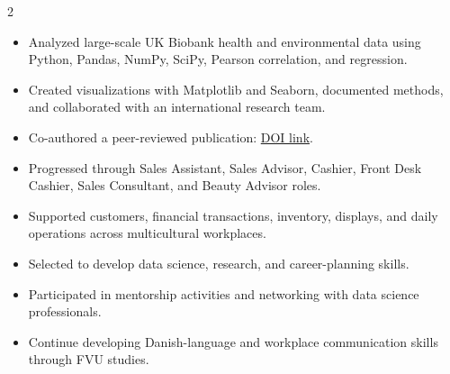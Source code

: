 \documentclass[10pt,a4paper,ragged2e,withhyper]{altacv}
\begin{document}
\begin{paracol}{2}
\begin{rightcolumn}
\divider

\begin{itemize}
    \item Analyzed large-scale UK Biobank health and environmental data using Python, Pandas, NumPy, SciPy, Pearson correlation, and regression.
    \item Created visualizations with Matplotlib and Seaborn, documented methods, and collaborated with an international research team.
    \item Co-authored a peer-reviewed publication: \href{https://doi.org/10.21698/rjeec.2025.210}{DOI link}.
\end{itemize}

\divider

\begin{itemize}
    \item Progressed through Sales Assistant, Sales Advisor, Cashier, Front Desk Cashier, Sales Consultant, and Beauty Advisor roles.
    \item Supported customers, financial transactions, inventory, displays, and daily operations across multicultural workplaces.
\end{itemize}


\begin{itemize}
    \item Selected to develop data science, research, and career-planning skills.
    \item Participated in mentorship activities and networking with data science professionals.
\end{itemize}

\begin{itemize}
    \item Continue developing Danish-language and workplace communication skills through FVU studies.
\end{itemize}




\end{rightcolumn}
\end{paracol}
\end{document}
